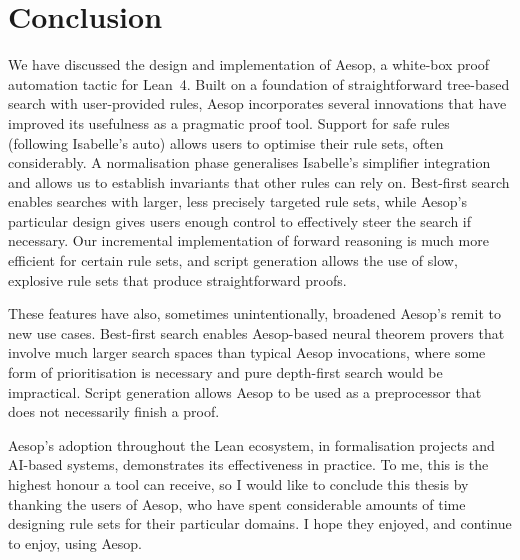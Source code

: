 \chapter{Conclusion}

We have discussed the design and implementation of Aesop, a white-box proof automation tactic for Lean~4.
Built on a foundation of straightforward tree-based search with user-provided rules, Aesop incorporates several innovations that have improved its usefulness as a pragmatic proof tool.
Support for safe rules (following Isabelle's auto) allows users to optimise their rule sets, often considerably.
A normalisation phase generalises Isabelle's simplifier integration and allows us to establish invariants that other rules can rely on.
Best-first search enables searches with larger, less precisely targeted rule sets, while Aesop's particular design gives users enough control to effectively steer the search if necessary.
Our incremental implementation of forward reasoning is much more efficient for certain rule sets, and script generation allows the use of slow, explosive rule sets that produce straightforward proofs.

These features have also, sometimes unintentionally, broadened Aesop's remit to new use cases.
Best-first search enables Aesop-based neural theorem provers that involve much larger search spaces than typical Aesop invocations, where some form of prioritisation is necessary and pure depth-first search would be impractical.
Script generation allows Aesop to be used as a preprocessor that does not necessarily finish a proof.

Aesop's adoption throughout the Lean ecosystem, in formalisation projects and AI-based systems, demonstrates its effectiveness in practice.
To me, this is the highest honour a tool can receive, so I would like to conclude this thesis by thanking the users of Aesop, who have spent considerable amounts of time designing rule sets for their particular domains.
I hope they enjoyed, and continue to enjoy, using Aesop.
